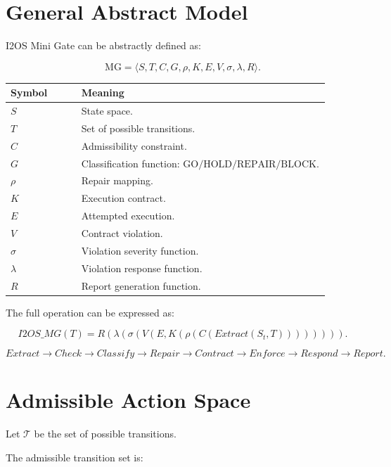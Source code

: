 \documentclass[11pt,a4paper]{article}
\newcommand{\MG}{\mathrm{MG}}
\newcommand{\GO}{\mathrm{GO}}
\newcommand{\HOLD}{\mathrm{HOLD}}
\newcommand{\REPAIR}{\mathrm{REPAIR}}
\newcommand{\BLOCK}{\mathrm{BLOCK}}
\begin{document}
\section{General Abstract Model}

I2OS Mini Gate can be abstractly defined as:

\[
\MG
=
\langle
S,T,C,G,\rho,K,E,V,\sigma,\lambda,R
\rangle.
\]

\begin{longtable}{p{0.20\linewidth} p{0.70\linewidth}}
\toprule
\textbf{Symbol} & \textbf{Meaning} \\
\midrule
\(S\) & State space. \\
\(T\) & Set of possible transitions. \\
\(C\) & Admissibility constraint. \\
\(G\) & Classification function: \(\GO/\HOLD/\REPAIR/\BLOCK\). \\
\(\rho\) & Repair mapping. \\
\(K\) & Execution contract. \\
\(E\) & Attempted execution. \\
\(V\) & Contract violation. \\
\(\sigma\) & Violation severity function. \\
\(\lambda\) & Violation response function. \\
\(R\) & Report generation function. \\
\bottomrule
\end{longtable}

The full operation can be expressed as:

\[
I2OS\_MG(T)
=
R
\left(
\lambda
\left(
\sigma
\left(
V
\left(
E,
K
\left(
\rho
\left(
C
\left(
Extract(S_t,T)
\right)
\right)
\right)
\right)
\right)
\right)
\right).
\]

\[
Extract
\rightarrow
Check
\rightarrow
Classify
\rightarrow
Repair
\rightarrow
Contract
\rightarrow
Enforce
\rightarrow
Respond
\rightarrow
Report.
\]

\section{Admissible Action Space}

Let \(\mathcal{T}\) be the set of possible transitions.

The admissible transition set is:
\end{document}
